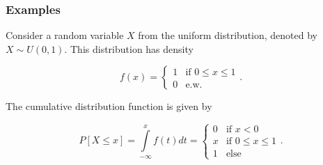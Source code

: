 \documentclass[12pt,a4paper]{article}
\theoremstyle{regla}
\theoremstyle{remark}
\theoremstyle{definition}
\theoremstyle{nonumberbreak}
\begin{document}
\subsubsection{Examples}
\begin{xmpl}
Consider a random variable $X$ from the uniform distribution, denoted by $X\sim U(0,1)$.  This distribution has density

$$
f(x) = 
\begin{cases}
  1 &\text{if } 0 \leq x \leq 1\\
  0 &\text{e.w.}
\end{cases}.
$$

The cumulative distribution function is given by

$$
P[X\leq x] = \int\limits^{x}_{-\infty} f(t)dt = 
\begin{cases}
  0 & \text{if } x<0\\
  x & \text{if } 0 \leq x \leq 1\\
  1 & \text{else}
\end{cases}.
$$

\end{xmpl}
\end{document}
